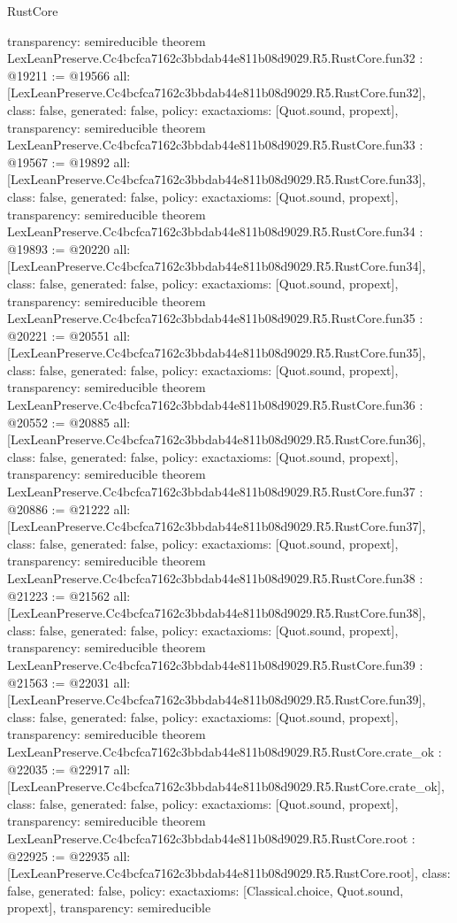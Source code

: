 \begin{lexlean}{RustCore}
\begin{coremodule}
{  transparency: semireducible
}
theorem LexLeanPreserve.Cc4bcfca7162c3bbdab44e811b08d9029.R5.RustCore.fun32 : @19211 := @19566 {
  all: [LexLeanPreserve.Cc4bcfca7162c3bbdab44e811b08d9029.R5.RustCore.fun32],
  class: false,
  generated: false,
  policy: exact{axioms: [Quot.sound, propext]},
  transparency: semireducible
}
theorem LexLeanPreserve.Cc4bcfca7162c3bbdab44e811b08d9029.R5.RustCore.fun33 : @19567 := @19892 {
  all: [LexLeanPreserve.Cc4bcfca7162c3bbdab44e811b08d9029.R5.RustCore.fun33],
  class: false,
  generated: false,
  policy: exact{axioms: [Quot.sound, propext]},
  transparency: semireducible
}
theorem LexLeanPreserve.Cc4bcfca7162c3bbdab44e811b08d9029.R5.RustCore.fun34 : @19893 := @20220 {
  all: [LexLeanPreserve.Cc4bcfca7162c3bbdab44e811b08d9029.R5.RustCore.fun34],
  class: false,
  generated: false,
  policy: exact{axioms: [Quot.sound, propext]},
  transparency: semireducible
}
theorem LexLeanPreserve.Cc4bcfca7162c3bbdab44e811b08d9029.R5.RustCore.fun35 : @20221 := @20551 {
  all: [LexLeanPreserve.Cc4bcfca7162c3bbdab44e811b08d9029.R5.RustCore.fun35],
  class: false,
  generated: false,
  policy: exact{axioms: [Quot.sound, propext]},
  transparency: semireducible
}
theorem LexLeanPreserve.Cc4bcfca7162c3bbdab44e811b08d9029.R5.RustCore.fun36 : @20552 := @20885 {
  all: [LexLeanPreserve.Cc4bcfca7162c3bbdab44e811b08d9029.R5.RustCore.fun36],
  class: false,
  generated: false,
  policy: exact{axioms: [Quot.sound, propext]},
  transparency: semireducible
}
theorem LexLeanPreserve.Cc4bcfca7162c3bbdab44e811b08d9029.R5.RustCore.fun37 : @20886 := @21222 {
  all: [LexLeanPreserve.Cc4bcfca7162c3bbdab44e811b08d9029.R5.RustCore.fun37],
  class: false,
  generated: false,
  policy: exact{axioms: [Quot.sound, propext]},
  transparency: semireducible
}
theorem LexLeanPreserve.Cc4bcfca7162c3bbdab44e811b08d9029.R5.RustCore.fun38 : @21223 := @21562 {
  all: [LexLeanPreserve.Cc4bcfca7162c3bbdab44e811b08d9029.R5.RustCore.fun38],
  class: false,
  generated: false,
  policy: exact{axioms: [Quot.sound, propext]},
  transparency: semireducible
}
theorem LexLeanPreserve.Cc4bcfca7162c3bbdab44e811b08d9029.R5.RustCore.fun39 : @21563 := @22031 {
  all: [LexLeanPreserve.Cc4bcfca7162c3bbdab44e811b08d9029.R5.RustCore.fun39],
  class: false,
  generated: false,
  policy: exact{axioms: [Quot.sound, propext]},
  transparency: semireducible
}
theorem LexLeanPreserve.Cc4bcfca7162c3bbdab44e811b08d9029.R5.RustCore.crate_ok : @22035 := @22917 {
  all: [LexLeanPreserve.Cc4bcfca7162c3bbdab44e811b08d9029.R5.RustCore.crate_ok],
  class: false,
  generated: false,
  policy: exact{axioms: [Quot.sound, propext]},
  transparency: semireducible
}
theorem LexLeanPreserve.Cc4bcfca7162c3bbdab44e811b08d9029.R5.RustCore.root : @22925 := @22935 {
  all: [LexLeanPreserve.Cc4bcfca7162c3bbdab44e811b08d9029.R5.RustCore.root],
  class: false,
  generated: false,
  policy: exact{axioms: [Classical.choice, Quot.sound, propext]},
  transparency: semireducible
}


\end{coremodule}
\end{lexlean}
